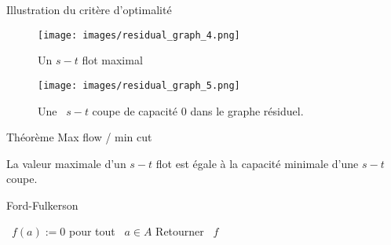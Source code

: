 \documentclass{beamer}
\begin{document}
\begin{frame}{Illustration du critère d'optimalité} \pause
  \begin{figure}
    \begin{minipage}{0.65\linewidth}
      \texttt{[image: images/residual\_graph\_4.png]}
    \end{minipage}
    \begin{minipage}{0.3\linewidth}
      \caption{Un $s-t$ flot maximal}
    \end{minipage}
  \end{figure}
  \vfill \pause
  \begin{figure}
    \begin{minipage}{0.65\linewidth}
      \texttt{[image: images/residual\_graph\_5.png]}
    \end{minipage}
    \begin{minipage}{0.3\linewidth}
      \caption{Une ~$s-t$ coupe de capacité $0$ dans le graphe résiduel.}
    \end{minipage}
  \end{figure}
\end{frame}

\begin{frame}[t]{Théorème Max flow / min cut} \pause
  \begin{theorem}[6.5]
    La valeur maximale d'un $s-t$ flot est égale à la capacité minimale d'une $s-t$ coupe. 
  \end{theorem}
\end{frame}


\begin{frame}[t]{Ford-Fulkerson}
  \setcounter{algocf}{4}
  \vfill
  \begin{algorithm}[H]
        \caption{Algorithme de Ford-Fulkerson}
   \SetAlgoLined 
   ~$f(a):= 0$ pour tout ~$a \in A$\; \pause
    \pause
   Retourner ~$f$
  \end{algorithm}
  \vfill 
\end{frame}

\end{document}
